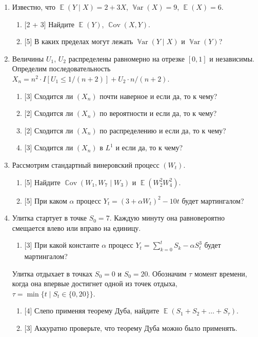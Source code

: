 \documentclass[12pt]{article}
\DeclareMathOperator{\Cov}{\mathbb{C}ov}
\DeclareMathOperator{\Var}{\mathbb{V}ar}
\DeclareMathOperator{\E}{\mathbb{E}}
\begin{document}
\begin{enumerate}

    \item Известно, что $\E(Y \mid X) = 2 + 3X$, $\Var(X) = 9$, $\E(X) = 6$.
    \begin{enumerate}
        \item {[2 + 3]} Найдите $\E(Y)$, $\Cov(X, Y)$.
        \item {[5]} В каких пределах могут лежать $\Var(Y \mid X)$ и $\Var(Y)$?
    \end{enumerate}


    \item Величины $U_1$, $U_2$ распределены равномерно на отрезке $[0, 1]$ и независимы.
    Определим последовательность $X_n = n^2 \cdot I[U_1 \leq 1/(n + 2)] + U_2 \cdot n/ (n+2)$.

    \begin{enumerate}
        \item {[3]} Сходится ли $(X_n)$ почти наверное и если да, то к чему?
        \item {[2]} Сходится ли $(X_n)$ по вероятности и если да, то к чему?
        \item {[2]} Сходится ли $(X_n)$ по распределению и если да, то к чему?
        \item {[3]} Сходится ли $(X_n)$ в $L^1$ и если да, то к чему?
    \end{enumerate}


    \newpage


    \item 
    Рассмотрим стандартный винеровский процесс $(W_t)$.
    \begin{enumerate}
        \item {[5]} Найдите $\Cov(W_1, W_7 \mid W_3)$ и $\E(W_2^2 W_4^2)$.
        \item {[5]} При каком $\alpha$ процесс $Y_t = (3 + \alpha W_t)^2 - 10t$ будет мартингалом?
    \end{enumerate}
    
    \item Улитка стартует в точке $S_0 = 7$. 
    Каждую минуту она равновероятно смещается влево или вправо на единицу. 
    \begin{enumerate}
        \item {[3]} При какой константе $\alpha$ процесс $Y_t = \sum_{k=0}^t S_k - \alpha S_t^3$ будет мартингалом?
    \end{enumerate}
    Улитка отдыхает в точках $S_0 = 0$ и $S_0 = 20$.
    Обозначим $\tau$ момент времени, когда она впервые достигнет одной из точек отдыха, $\tau = \min\{t \mid S_t \in\{0, 20\}\}$.
    \begin{enumerate}[resume]
        \item {[4]} Слепо применяя теорему Дуба, найдите $\E(S_1 + S_2 +\dots + S_\tau)$.
        \item {[3]} Аккуратно проверьте, что теорему Дуба можно было применять. 
    \end{enumerate}


\end{enumerate}
\end{document}
